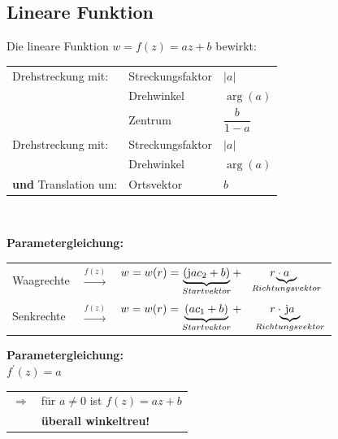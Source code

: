 \subsection{Lineare Funktion}
	\begin{minipage}[]{0.5\textwidth}
		\scalebox{0.5}{}
	\end{minipage}
	\begin{minipage}[]{0.5\textwidth}
		Die lineare Funktion $w = f\left( z \right) = a z + b$ bewirkt:\\[3pt]
		\renewcommand{\arraystretch}{1.7}
		\begin{tabular}{|lll|}
			\hline
			Drehstreckung mit: & Streckungsfaktor & $\left|a\right|$\\
	 & Drehwinkel & $\operatorname{arg}\left( a \right)$\\
	 & Zentrum & $\dfrac{b}{1-a}$\\[6pt]
			\hline
			Drehstreckung mit: & Streckungsfaktor & $\left|a\right|$\\
			& Drehwinkel & $\operatorname{arg}\left( a \right)$\\
			\textbf{und} Translation um: & Ortsvektor & $b$\\
			\hline
		\end{tabular}
	\renewcommand{\arraystretch}{1}
	\end{minipage}\\[3pt]
	\begin{minipage}[t]{0.7\textwidth}
		\textbf{Parametergleichung:}\\[3pt]
		\begin{tabular}{lcl}
			Waagrechte & $\xrightarrow[]{f\left( z \right)}$ & $w = w(r) = \underbrace{\left( \mathrm{j} a c_2 + b \right)}_{Startvektor} + \hspace{25pt} r \cdot \hspace{-28pt} \underbrace{a}_{Richtungsvektor}$\\[3pt]
			Senkrechte & $\xrightarrow[]{f\left( z \right)}$ & $w = w(r) = \underbrace{\left( a c_1 + b \right)}_{Startvektor} + \hspace{25pt} r \cdot \hspace{-25pt} \underbrace{\mathrm{j}a}_{Richtungsvektor}$\\[3pt]
		\end{tabular}
	\end{minipage}
	\begin{minipage}[t]{0.3\textwidth}
		\textbf{Parametergleichung:}\\[3pt]
		$f^{\prime}\left( z \right) = a$\\[3pt]
		\begin{tabular}{ll}
			$\Rightarrow$ & für $a \neq 0$ ist $f\left( z \right) = a z + b$\\[3pt]
	 & \textbf{überall winkeltreu!}
		\end{tabular}
	\end{minipage}


